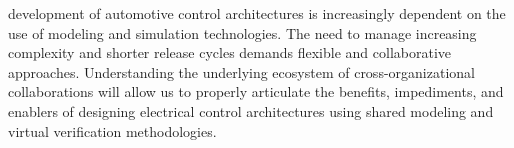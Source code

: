 
% 
% 
% 
% 

 development of automotive control architectures is increasingly dependent on the use of modeling and simulation technologies.
The need to manage increasing complexity and shorter release cycles demands flexible and collaborative approaches.
Understanding the underlying ecosystem of cross-organizational collaborations will allow us to properly articulate the benefits, impediments, and enablers of designing electrical control architectures using shared modeling and virtual verification methodologies.


